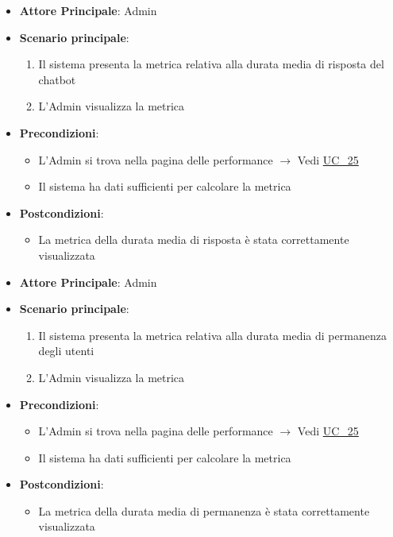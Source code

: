 \label{uc_25.1}
\begin{itemize}
    \item \textbf{Attore Principale}: Admin
	\item \textbf{Scenario principale}:
	\begin{enumerate}
		\item Il sistema presenta la metrica relativa alla durata media di risposta del chatbot
		\item L'Admin visualizza la metrica
	\end{enumerate}
	\item \textbf{Precondizioni}:
	\begin{itemize}
		\item L'Admin si trova nella pagina delle performance $\rightarrow$ Vedi \hyperref[uc_25]{UC\_25}
		\item Il sistema ha dati sufficienti per calcolare la metrica
	\end{itemize}
	\item \textbf{Postcondizioni}:
	\begin{itemize}
		\item La metrica della durata media di risposta è stata correttamente visualizzata
	\end{itemize}
\end{itemize}

\label{uc_25.2}
\begin{itemize}
    \item \textbf{Attore Principale}: Admin
	\item \textbf{Scenario principale}:
	\begin{enumerate}
		\item Il sistema presenta la metrica relativa alla durata media di permanenza degli utenti
		\item L'Admin visualizza la metrica
	\end{enumerate}
	\item \textbf{Precondizioni}:
	\begin{itemize}
		\item L'Admin si trova nella pagina delle performance $\rightarrow$ Vedi \hyperref[uc_25]{UC\_25}
		\item Il sistema ha dati sufficienti per calcolare la metrica
	\end{itemize}
	\item \textbf{Postcondizioni}:
	\begin{itemize}
		\item La metrica della durata media di permanenza è stata correttamente visualizzata
	\end{itemize}
\end{itemize}